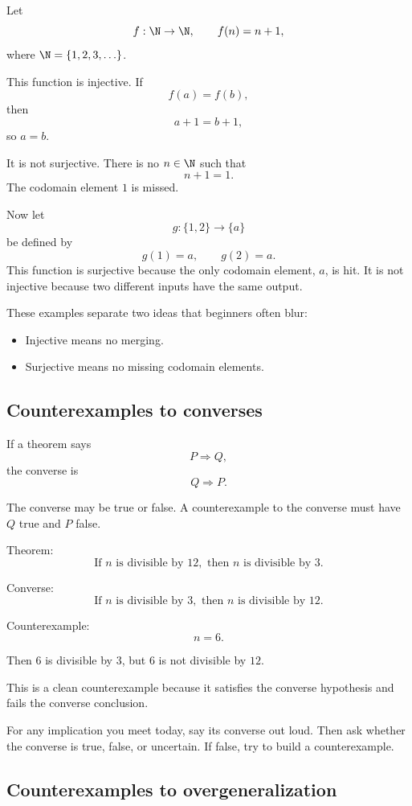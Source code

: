 Let
\[
f:\N\to\N,\qquad f(n)=n+1,
\]
where $\N=\{1,2,3,\ldots\}$.

This function is injective. If
\[
f(a)=f(b),
\]
then
\[
a+1=b+1,
\]
so $a=b$.

It is not surjective. There is no $n\in\N$ such that
\[
n+1=1.
\]
The codomain element $1$ is missed.

Now let
\[
g:\{1,2\}\to\{a\}
\]
be defined by
\[
g(1)=a,\qquad g(2)=a.
\]
This function is surjective because the only codomain element, $a$, is hit. It is not injective because two different inputs have the same output.

These examples separate two ideas that beginners often blur:

\begin{itemize}
\item Injective means no merging.
\item Surjective means no missing codomain elements.
\end{itemize}

\subsection{Counterexamples to converses}

If a theorem says
\[
P\Rightarrow Q,
\]
the converse is
\[
Q\Rightarrow P.
\]

The converse may be true or false. A counterexample to the converse must have $Q$ true and $P$ false.

Theorem:
\[
\text{If }n\text{ is divisible by }12,\text{ then }n\text{ is divisible by }3.
\]

Converse:
\[
\text{If }n\text{ is divisible by }3,\text{ then }n\text{ is divisible by }12.
\]

Counterexample:
\[
n=6.
\]

Then $6$ is divisible by $3$, but $6$ is not divisible by $12$.

This is a clean counterexample because it satisfies the converse hypothesis and fails the converse conclusion.

\begin{walkbox}
For any implication you meet today, say its converse out loud. Then ask whether the converse is true, false, or uncertain. If false, try to build a counterexample.
\end{walkbox}

\subsection{Counterexamples to overgeneralization}

